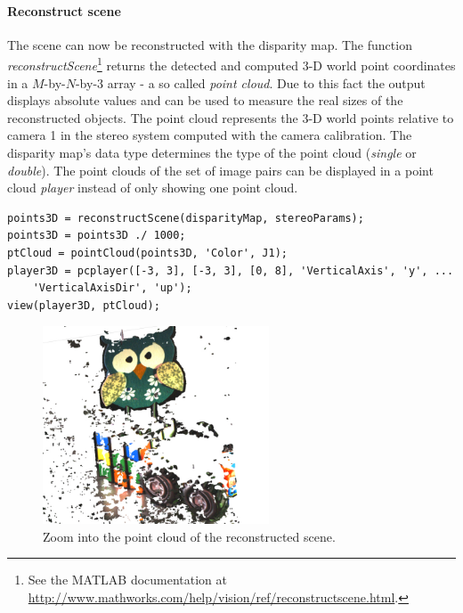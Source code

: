 \paragraph{Reconstruct scene}
The scene can now be reconstructed with the disparity map. The function \textit{reconstructScene}\footnote{See the MATLAB documentation at \url{http://www.mathworks.com/help/vision/ref/reconstructscene.html}.} returns the detected and computed 3-D world point coordinates in a $M$-by-$N$-by-$3$ array - a so called \textit{point cloud}. Due to this fact the output displays absolute values and can be used to measure the real sizes of the reconstructed objects. The point cloud represents the 3-D world points relative to camera 1 in the stereo system computed with the camera calibration. The disparity map's data type determines the type of the point cloud (\textit{single} or \textit{double}). The point clouds of the set of image pairs can be displayed in a point cloud \textit{player} instead of only showing one point cloud.

\begin{lstlisting}[caption={Reconstruction of the scene, saved as a point cloud.}]
points3D = reconstructScene(disparityMap, stereoParams);
points3D = points3D ./ 1000;
ptCloud = pointCloud(points3D, 'Color', J1);
player3D = pcplayer([-3, 3], [-3, 3], [0, 8], 'VerticalAxis', 'y', ...
    'VerticalAxisDir', 'up');
view(player3D, ptCloud);
\end{lstlisting}

\begin{figure}[htbp]
		\centering
		\includegraphics[width=0.6\textwidth]{figures/PointCloud}
		\caption[Zoom into the point cloud of the reconstructed scene]{Zoom into the point cloud of the reconstructed scene.}
		\label{fig:PointCloud}
\end{figure}

